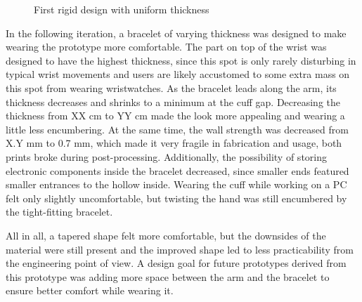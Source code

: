\begin{figure}[bth]
	\myfloatalign
	 \quad
	\caption{First rigid design with uniform thickness}
\end{figure}

In the following iteration, a bracelet of varying thickness was designed to make wearing the prototype more comfortable. The part on top of the wrist was designed to have the highest thickness, since this spot is only rarely disturbing in typical wrist movements and users are likely accustomed to some extra mass on this spot from wearing wristwatches. As the bracelet leads along the arm, its thickness decreases and shrinks to a minimum at the cuff gap. Decreasing the thickness from XX cm to YY cm made the look more appealing and wearing a little less encumbering. At the same time, the wall strength was decreased from X.Y mm to 0.7 mm, which made it very fragile in fabrication and usage, both prints broke during post-processing. Additionally, the possibility of storing electronic components inside the bracelet decreased, since smaller ends featured smaller entrances to the hollow inside. Wearing the cuff while working on a PC felt only slightly uncomfortable, but twisting the hand was still encumbered by the tight-fitting bracelet. 

All in all, a tapered shape felt more comfortable, but the downsides of the material were still present and the improved shape led to less practicability from the engineering point of view. A design goal for future prototypes derived from this prototype was adding more space between the arm and the bracelet to ensure better comfort while wearing it.

